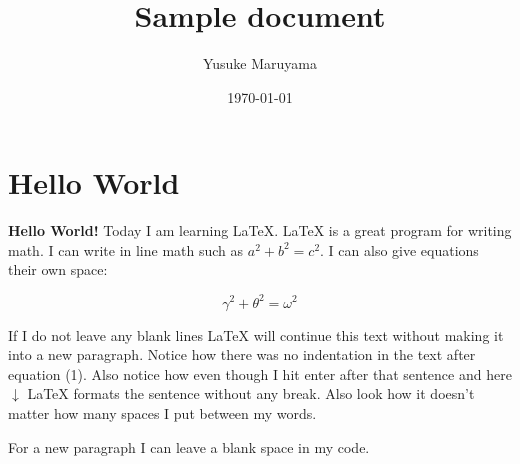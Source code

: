 \documentclass[uplatex]{jsarticle}
\title{Sample document}
\author{Yusuke Maruyama}
\date{\today}
\begin{document}
\maketitle

\section{Hello World}
\textbf{Hello World!} Today I am learning \LaTeX.
\LaTeX{} is a great program for writing math. I can write in line math such as $a^2 + b^2 = c^2$.
I can also give equations their own space:

\begin{equation}
  \gamma^2 + \theta^2 = \omega^2
\end{equation}

If I do not leave any blank lines \LaTeX{} will continue  this text without making it into a new paragraph.  Notice how there was no indentation in the text after equation (1).  
Also notice how even though I hit enter after that sentence and here $\downarrow$
 \LaTeX{} formats the sentence without any break.  Also   look  how      it   doesn't     matter          how    many  spaces     I put     between       my    words.

For a new paragraph I can leave a blank space in my code. 
\end{document}
